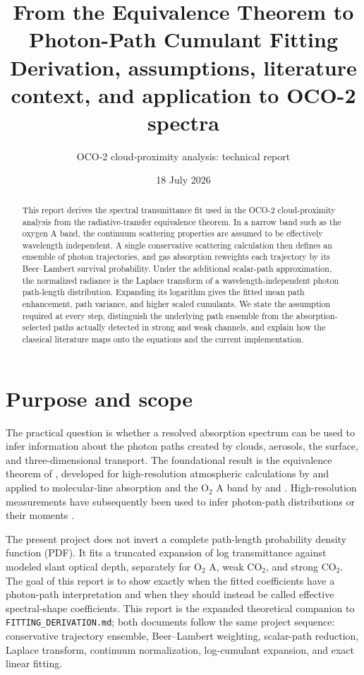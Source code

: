 \documentclass[11pt]{article}
\title{From the Equivalence Theorem to Photon-Path Cumulant Fitting\\
\large Derivation, assumptions, literature context, and application to OCO-2 spectra}
\author{OCO-2 cloud-proximity analysis: technical report}
\date{18 July 2026}
\begin{document}
\maketitle

\begin{abstract}
This report derives the spectral transmittance fit used in the OCO-2
cloud-proximity analysis from the radiative-transfer equivalence theorem.  In a
narrow band such as the oxygen A band, the continuum scattering properties are
assumed to be effectively wavelength independent.  A single conservative
scattering calculation then defines an ensemble of photon trajectories, and
gas absorption reweights each trajectory by its Beer--Lambert survival
probability.  Under the additional scalar-path approximation, the normalized
radiance is the Laplace transform of a wavelength-independent photon
path-length distribution.  Expanding its logarithm gives the fitted mean path
enhancement, path variance, and higher scaled cumulants.  We state the
assumption required at every step, distinguish the underlying path ensemble
from the absorption-selected paths actually detected in strong and weak
channels, and explain how the classical literature maps onto the equations and
the current implementation.
\end{abstract}

\section{Purpose and scope}

The practical question is whether a resolved absorption spectrum can be used
to infer information about the photon paths created by clouds, aerosols, the
surface, and three-dimensional transport.  The foundational result is the
equivalence theorem of \citet{irvine1964}, developed for high-resolution
atmospheric calculations by \citet{partain2000} and applied to molecular-line
absorption and the O$_2$ A band by \citet{stephens2000} and
\citet{heidinger2000}.  High-resolution measurements have subsequently been
used to infer photon-path distributions or their moments
\citep{funk2003,min2004,scholl2006}.

The present project does not invert a complete path-length probability density
function (PDF).  It fits a truncated expansion of log transmittance against
modeled slant optical depth, separately for O$_2$ A, weak CO$_2$, and strong
CO$_2$.  The goal of this report is to show exactly when the fitted
coefficients have a photon-path interpretation and when they should instead be
called effective spectral-shape coefficients.  This report is the expanded
theoretical companion to \texttt{FITTING\_DERIVATION.md}; both documents follow
the same project sequence: conservative trajectory ensemble, Beer--Lambert
weighting, scalar-path reduction, Laplace transform, continuum normalization,
log-cumulant expansion, and exact linear fitting.
\end{document}

